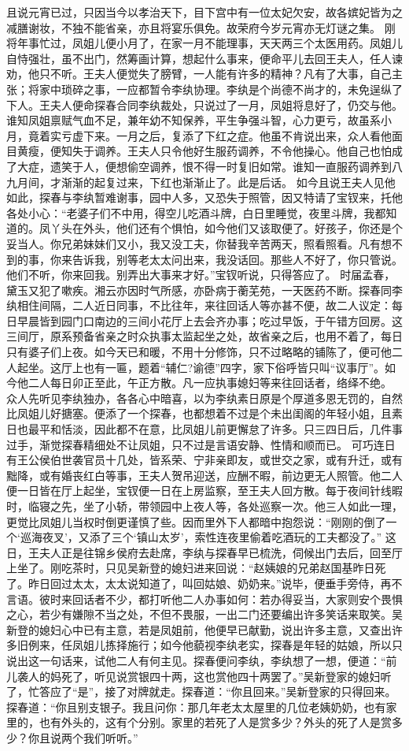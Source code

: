 \documentclass[12pt,oneside]{book}
\begin{document}
且说元宵已过，只因当今以孝治天下，目下宫中有一位太妃欠安，故各嫔妃皆为之减膳谢妆，不独不能省亲，亦且将宴乐俱免。故荣府今岁元宵亦无灯谜之集。
刚将年事忙过，凤姐儿便小月了，在家一月不能理事，天天两三个太医用药。凤姐儿自恃强壮，虽不出门，然筹画计算，想起什么事来，便命平儿去回王夫人，任人谏劝，他只不听。王夫人便觉失了膀臂，一人能有许多的精神？凡有了大事，自己主张；将家中琐碎之事，一应都暂令李纨协理。李纨是个尚德不尚才的，未免逞纵了下人。王夫人便命探春合同李纨裁处，只说过了一月，凤姐将息好了，仍交与他。谁知凤姐禀赋气血不足，兼年幼不知保养，平生争强斗智，心力更亏，故虽系小月，竟着实亏虚下来。一月之后，复添了下红之症。他虽不肯说出来，众人看他面目黄瘦，便知失于调养。王夫人只令他好生服药调养，不令他操心。他自己也怕成了大症，遗笑于人，便想偷空调养，恨不得一时复旧如常。谁知一直服药调养到八九月间，才渐渐的起复过来，下红也渐渐止了。此是后话。
如今且说王夫人见他如此，探春与李纨暂难谢事，园中人多，又恐失于照管，因又特请了宝钗来，托他各处小心：“老婆子们不中用，得空儿吃酒斗牌，白日里睡觉，夜里斗牌，我都知道的。凤丫头在外头，他们还有个惧怕，如今他们又该取便了。好孩子，你还是个妥当人。你兄弟妹妹们又小，我又没工夫，你替我辛苦两天，照看照看。凡有想不到的事，你来告诉我，别等老太太问出来，我没话回。那些人不好了，你只管说。他们不听，你来回我。别弄出大事来才好。”宝钗听说，只得答应了。
时届孟春，黛玉又犯了嗽疾。湘云亦因时气所感，亦卧病于蘅芜苑，一天医药不断。探春同李纨相住间隔，二人近日同事，不比往年，来往回话人等亦甚不便，故二人议定：每日早晨皆到园门口南边的三间小花厅上去会齐办事；吃过早饭，于午错方回房。这三间厅，原系预备省亲之时众执事太监起坐之处，故省亲之后，也用不着了，每日只有婆子们上夜。如今天已和暖，不用十分修饰，只不过略略的铺陈了，便可他二人起坐。这厅上也有一匾，题着“辅仁?谕德”四字，家下俗呼皆只叫“议事厅”。如今他二人每日卯正至此，午正方散。凡一应执事媳妇等来往回话者，络绎不绝。
众人先听见李纨独办，各各心中暗喜，以为李纨素日原是个厚道多恩无罚的，自然比凤姐儿好搪塞。便添了一个探春，也都想着不过是个未出闺阁的年轻小姐，且素日也最平和恬淡，因此都不在意，比凤姐儿前更懈怠了许多。只三四日后，几件事过手，渐觉探春精细处不让凤姐，只不过是言语安静、性情和顺而已。
可巧连日有王公侯伯世袭官员十几处，皆系荣、宁非亲即友，或世交之家，或有升迁，或有黜降，或有婚丧红白等事，王夫人贺吊迎送，应酬不暇，前边更无人照管。他二人便一日皆在厅上起坐，宝钗便一日在上房监察，至王夫人回方散。每于夜间针线暇时，临寝之先，坐了小轿，带领园中上夜人等，各处巡察一次。他三人如此一理，更觉比凤姐儿当权时倒更谨慎了些。因而里外下人都暗中抱怨说：“刚刚的倒了一个‘巡海夜叉’，又添了三个‘镇山太岁’，索性连夜里偷着吃酒玩的工夫都没了。”
这日，王夫人正是往锦乡侯府去赴席，李纨与探春早已梳洗，伺候出门去后，回至厅上坐了。刚吃茶时，只见吴新登的媳妇进来回说：“赵姨娘的兄弟赵国基昨日死了。昨日回过太太，太太说知道了，叫回姑娘、奶奶来。”说毕，便垂手旁侍，再不言语。彼时来回话者不少，都打听他二人办事如何：若办得妥当，大家则安个畏惧之心，若少有嫌隙不当之处，不但不畏服，一出二门还要编出许多笑话来取笑。吴新登的媳妇心中已有主意，若是凤姐前，他便早已献勤，说出许多主意，又查出许多旧例来，任凤姐儿拣择施行；如今他藐视李纨老实，探春是年轻的姑娘，所以只说出这一句话来，试他二人有何主见。探春便问李纨，李纨想了一想，便道：“前儿袭人的妈死了，听见说赏银四十两，这也赏他四十两罢了。”吴新登家的媳妇听了，忙答应了“是”，接了对牌就走。探春道：“你且回来。”吴新登家的只得回来。探春道：“你且别支银子。我且问你：那几年老太太屋里的几位老姨奶奶，也有家里的，也有外头的，这有个分别。家里的若死了人是赏多少？外头的死了人是赏多少？你且说两个我们听听。”
\end{document}

